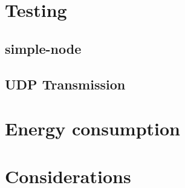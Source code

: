 \section{Testing}

\subsection{simple-node}

\subsection{UDP Transmission}



\section{Energy consumption}

\section{Considerations}
